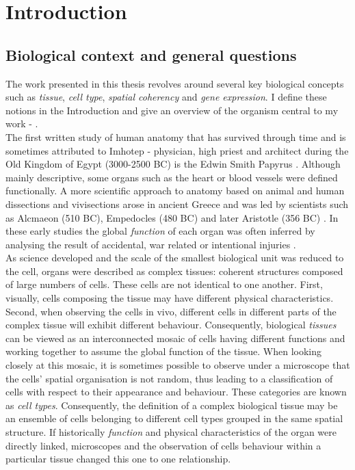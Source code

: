 %
\chapter{Introduction}\label{ch:background}
%

\section{Biological context and general questions}
	
	The work presented in this thesis revolves around several key biological concepts such as \emph{tissue}, \emph{cell type}, \emph{spatial coherency} and \emph{gene expression}. I define these notions in the Introduction and give an overview of the organism central to my work - \platyfull{}.\\
	
    The first written study of human anatomy that has survived through time and is sometimes attributed to Imhotep - physician, high priest and architect during the Old Kingdom of Egypt (3000-2500 BC) is the Edwin Smith Papyrus \citep{goodwin98,breasted30}. Although mainly descriptive, some organs such as the heart or blood vessels were defined functionally. A more scientific approach to anatomy based on animal and human dissections and vivisections arose in ancient Greece and was led by scientists such as Alcmaeon (510 BC),  Empedocles (480 BC) and later Aristotle (356 BC) \citep{singer57}. In these early studies the global \emph{function} of each organ was often inferred by analysing the result of accidental, war related or intentional injuries \citep{singer57}.\\ 
    
    As science developed and the scale of the smallest biological unit was reduced to the cell, organs were described as complex tissues: coherent structures composed of large numbers of cells. These cells are not identical to one another. First, visually, cells composing the tissue may have different physical characteristics. Second, when observing the cells in vivo, different cells in different parts of the complex tissue will exhibit different behaviour. Consequently, biological \emph{tissues} can be viewed as an interconnected mosaic of cells having different functions and working together to assume the global function of the tissue. When looking closely at this mosaic, it is sometimes possible to observe under a microscope \citep{young13} that the cells' spatial organisation is not random, thus leading to a classification of cells with respect to their appearance and behaviour. These categories are known as \emph{cell types}. Consequently, the definition of a complex biological tissue may be an ensemble of cells belonging to different cell types grouped in the same spatial structure.  If historically \emph{function} and physical characteristics of the organ were directly linked, microscopes and the observation of cells behaviour within a particular tissue changed this one to one relationship.\\
    
